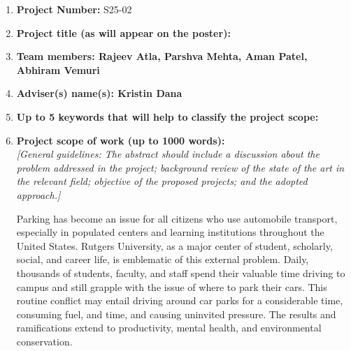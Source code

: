 \documentclass{article}
\begin{document}
\vspace{2em}
\begin{enumerate}[leftmargin=1.5cm]
    \item \textbf{\large Project Number:} S25-02\\
    
    \vspace{1em}

    \item \textbf{\large  Project title (as will appear on the poster):} \\
    
    \vspace{1em}

    \item \textbf{\large Team members: Rajeev Atla, Parshva Mehta, Aman Patel, Abhiram Vemuri} \\
    
    \vspace{1em}

    \item \textbf{\large Adviser(s) name(s): Kristin Dana} \\
    
    \vspace{1em}

    \item \textbf{\large Up to 5 keywords that will help to classify the project scope:} \\
    
    \vspace{1em}

    \item \textbf{\large Project scope of work (up to 1000 words):} \\
    \textit{[General guidelines: The abstract should include a discussion about the problem addressed in the project; background review of the state of the art in the relevant field; objective of the proposed projects; and the adopted approach.]}
    
    Parking has become an issue for all citizens who use automobile transport, 
    especially in populated centers and learning institutions throughout the United States. 
    Rutgers University, 
    as a major center of student, 
    scholarly, 
    social, 
    and career life, 
    is emblematic of this external problem. Daily, thousands of students, faculty, and staff spend their valuable time driving to campus and still grapple with the issue of where to park their cars. This routine conflict may entail driving around car parks for a considerable time, consuming fuel, and time, and causing uninvited pressure. The results and ramifications extend to productivity, mental health, and environmental conservation.


\end{enumerate}
\end{document}
